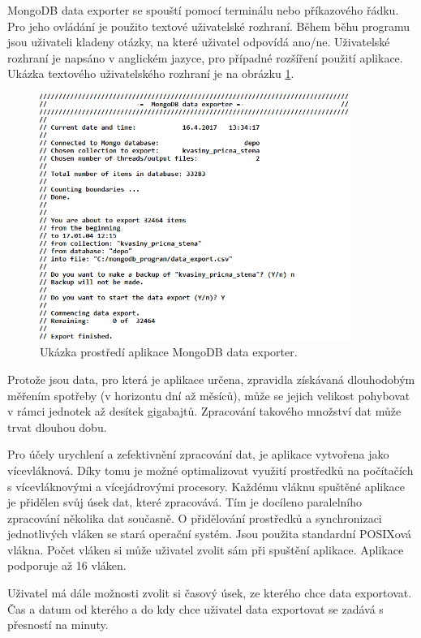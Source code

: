MongoDB data exporter se spouští pomocí terminálu nebo příkazového řádku. Pro jeho ovládání je použito textové uživatelské rozhraní. Během běhu programu jsou uživateli kladeny otázky, na které uživatel odpovídá ano/ne. Uživatelské rozhraní je napsáno v anglickém jazyce, pro případné rozšíření použití aplikace. Ukázka textového uživatelského rozhraní je na obrázku \ref{ukazka_run_pic}.
\\
\begin{figure}[ht]
    \includegraphics[width=0.9\textwidth]{ukazka_run}
    \caption{Ukázka prostředí aplikace MongoDB data exporter.}
    \label{ukazka_run_pic}
\end{figure}

Protože jsou data, pro která je aplikace určena, zpravidla získávaná dlouhodobým měřením spotřeby (v horizontu dní až měsíců), může se jejich velikost pohybovat v rámci jednotek až desítek gigabajtů. Zpracování takového množství dat může trvat dlouhou dobu. 

Pro účely urychlení a zefektivnění zpracování dat, je aplikace vytvořena jako vícevláknová. Díky tomu je možné optimalizovat využití prostředků na počítačích s vícevláknovými a vícejádrovými procesory. Každému vláknu spuštěné aplikace je přidělen svůj úsek dat, které zpracovává. Tím je docíleno paralelního zpracování několika dat současně. O přidělování prostředků a synchronizaci jednotlivých vláken se stará operační systém. Jsou použita standardní POSIXová vlákna. Počet vláken si může uživatel zvolit sám při spuštění aplikace. Aplikace podporuje až 16 vláken.       

Uživatel má dále možnosti zvolit si časový úsek, ze kterého chce data exportovat. Čas a datum od kterého a do kdy chce uživatel data exportovat se zadává s přesností na minuty. 

